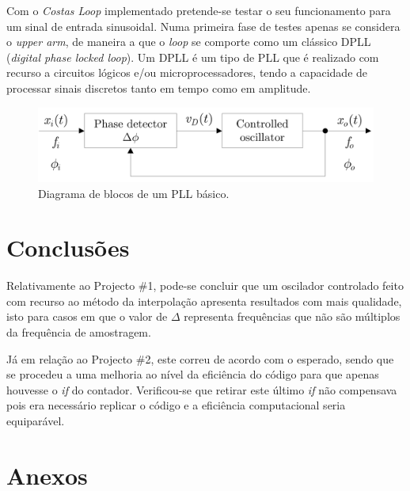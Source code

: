\documentclass[11pt]{article}
\numberwithin{equation}{section}
\begin{document}


Com o \textit{Costas Loop} implementado pretende-se testar o seu funcionamento para um sinal de entrada sinusoidal. Numa primeira fase de testes apenas se considera o \textit{upper arm}, de maneira a que o \textit{loop} se comporte como um clássico DPLL (\textit{digital phase locked loop}). Um DPLL é um tipo de PLL que é realizado com recurso a circuitos lógicos e/ou microprocessadores, tendo a capacidade de processar sinais discretos tanto em tempo como em amplitude.


\begin{figure}[H]
	\centering
	\includegraphics[keepaspectratio=true, scale=0.27]{teoricas/pll}
	\caption{Diagrama de blocos de um PLL básico.}
	\vspace{-0.8em}
\end{figure}


\pagebreak

\section{Conclusões}

Relativamente ao Projecto \#1, pode-se concluir que um oscilador controlado feito com recurso ao método da interpolação apresenta resultados com mais qualidade, isto para casos em que o valor de $\Delta$ representa frequências que não são múltiplos da frequência de amostragem. 

Já em relação ao Projecto \#2, este correu de acordo com o esperado, sendo que se procedeu a uma melhoria ao nível da eficiência do código para que apenas houvesse o \textit{if} do contador. Verificou-se que retirar este último \textit{if} não compensava pois era necessário replicar o código e a eficiência computacional seria equiparável. 

\pagebreak

\section{Anexos}
\end{document}
